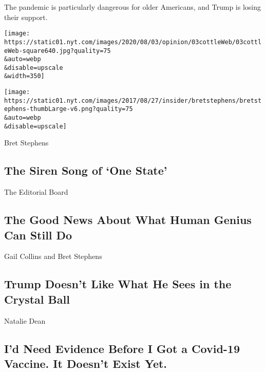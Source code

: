 The pandemic is particularly dangerous for older Americans, and Trump is
losing their support.

\href{/2020/08/03/opinion/senior-voters-biden-trump-2020.html}{}

\texttt{[image: https://static01.nyt.com/images/2020/08/03/opinion/03cottleWeb/03cottleWeb-square640.jpg?quality=75\\\&auto=webp\\\&disable=upscale\\\&width=350]}

\href{/2020/08/03/opinion/israel-palestine-one-state-solution.html}{}

\texttt{[image: https://static01.nyt.com/images/2017/08/27/insider/bretstephens/bretstephens-thumbLarge-v6.png?quality=75\\\&auto=webp\\\&disable=upscale]}

Bret Stephens

\hypertarget{the-siren-song-of-one-state}{%
\subsection{The Siren Song of `One
State'}\label{the-siren-song-of-one-state}}

\href{/2020/08/03/opinion/spacex-stonehenge-mars.html}{}

The Editorial Board

\hypertarget{the-good-news-about-what-human-genius-can-still-do}{%
\subsection{The Good News About What Human Genius Can Still
Do}\label{the-good-news-about-what-human-genius-can-still-do}}

\href{/2020/08/03/opinion/trump-biden-2020.html}{}

Gail Collins and Bret Stephens

\hypertarget{trump-doesnt-like-what-he-sees-in-the-crystal-ball}{%
\subsection{Trump Doesn't Like What He Sees in the Crystal
Ball}\label{trump-doesnt-like-what-he-sees-in-the-crystal-ball}}

\href{/2020/08/03/opinion/coronavirus-vaccine-efficacy-trials.html}{}

Natalie Dean

\hypertarget{id-need-evidence-before-i-got-a-covid-19-vaccine-it-doesnt-exist-yet}{%
\subsection{I'd Need Evidence Before I Got a Covid-19 Vaccine. It
Doesn't Exist
Yet.}\label{id-need-evidence-before-i-got-a-covid-19-vaccine-it-doesnt-exist-yet}}

